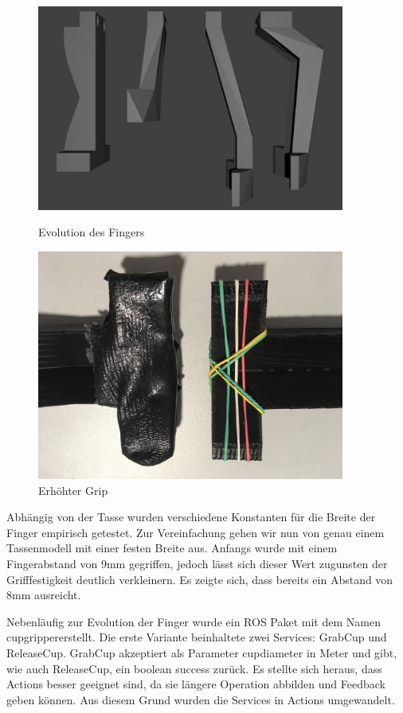 \begin{figure}
    \centering
    \begin{minipage}{0.45\textwidth}
        \centering
        \includegraphics[width=0.9\textwidth]{images/finger_evolution.png} %
        \caption{Evolution des Fingers}
    \end{minipage}\hfill
    \begin{minipage}{0.45\textwidth}
        \centering
        \includegraphics[width=0.9\textwidth]{images/finger_tip.JPG} %
        \caption{Erhöhter Grip}
    \end{minipage}
\end{figure}

Abhängig von der Tasse wurden verschiedene Konstanten für die Breite der Finger empirisch getestet. Zur Vereinfachung gehen wir nun von genau einem Tassenmodell mit einer festen Breite aus. Anfangs wurde mit einem Fingerabstand von 9mm gegriffen, jedoch lässt sich dieser Wert zugunsten der Grifffestigkeit deutlich verkleinern. Es zeigte sich, dass bereits ein Abstand von 8mm ausreicht.

Nebenläufig zur Evolution der Finger wurde ein ROS Paket mit dem Namen \glqq cup\textunderscore gripper\grqq  erstellt. Die erste Variante beinhaltete zwei Services: GrabCup und ReleaseCup. GrabCup akzeptiert als Parameter cup\textunderscore diameter in Meter und gibt, wie auch ReleaseCup, ein boolean success zurück. Es stellte sich heraus, dass Actions besser geeignet sind, da sie längere Operation abbilden und Feedback geben können. Aus diesem Grund wurden die Services in Actions umgewandelt.
